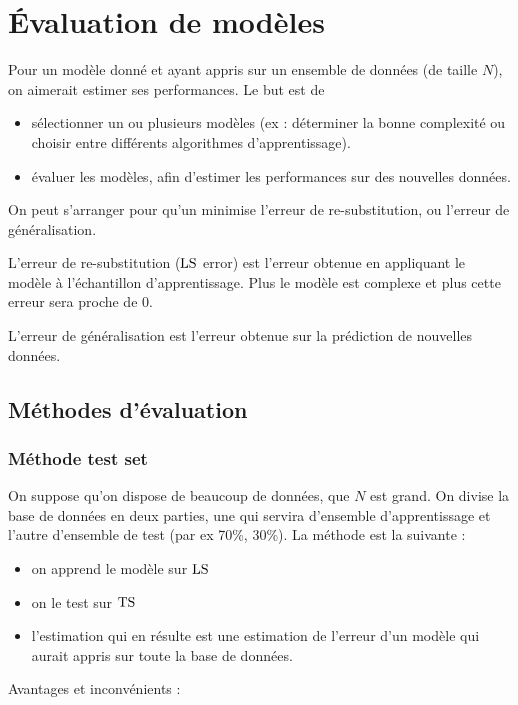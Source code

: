 \chapter{Évaluation de modèles}

Pour un modèle donné et ayant appris sur un ensemble de données (de taille $N$), on aimerait estimer ses performances. Le but est de

\begin{itemize}
	\item sélectionner un ou plusieurs modèles (ex : déterminer la bonne complexité ou choisir entre différents algorithmes d'apprentissage).
	\item évaluer les modèles, afin d'estimer les performances sur des nouvelles données.
\end{itemize}


On peut s'arranger pour qu'un minimise l'erreur de re-substitution, ou l'erreur de généralisation.

L'erreur de re-substitution ($\text{LS}$ error) est l'erreur obtenue en appliquant le modèle à l'échantillon d'apprentissage. Plus le modèle est complexe et plus cette erreur sera proche de 0.

L'erreur de généralisation est l'erreur obtenue sur la prédiction de nouvelles données.

\section{Méthodes d'évaluation}
	\subsection{Méthode test set}

	On suppose qu'on dispose de beaucoup de données, que $N$ est grand. On divise la base de données en deux parties, une qui servira d'ensemble d'apprentissage et l'autre d'ensemble de test (par ex 70\%, 30\%). La méthode est la suivante :

	\begin{itemize}
		\item on apprend le modèle sur $\text{LS}$
		\item on le test sur $\text{TS}$
		\item l'estimation qui en résulte est une estimation de l'erreur d'un modèle qui aurait appris sur toute la base de données.
	\end{itemize}
	
	Avantages et inconvénients :
	
